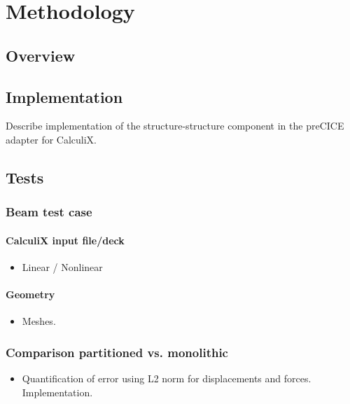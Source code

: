 \documentclass[a4paper, 11pt, oneside]{Thesis}  %
\begin{document}
        
\chapter{Methodology}

    \section{Overview}

    \section{Implementation}
    
        Describe implementation of the structure-structure component in the preCICE adapter for CalculiX.
    
    \section{Tests}
    
        \subsection{Beam test case}
            
            \subsubsection{CalculiX input file/deck}
                \begin{itemize}
                    \item Linear / Nonlinear
                \end{itemize}
            \subsubsection{Geometry}
                \begin{itemize}
                    \item Meshes.
                \end{itemize}
        
        \subsection{Comparison partitioned vs. monolithic}

            \begin{itemize}
                \item Quantification of error using L2 norm for displacements and forces. Implementation.
            \end{itemize}
            
\end{document}
